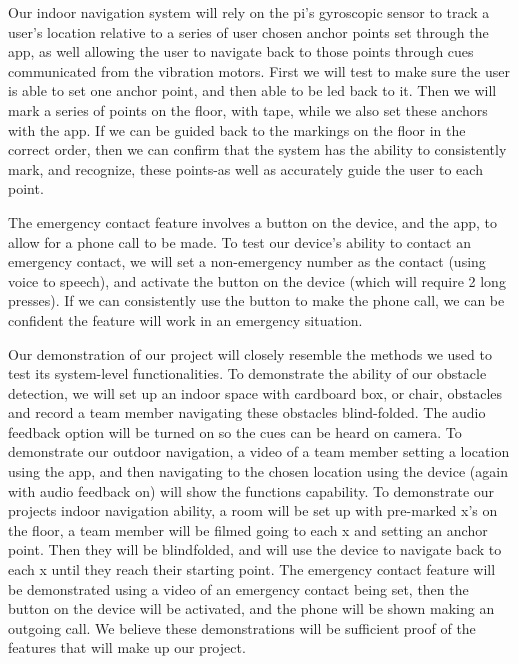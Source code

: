 \documentclass[letterpaper,12pt]{article}
\begin{document}
Our indoor navigation system will rely on the pi's gyroscopic sensor to track a user's location relative to a series of user chosen anchor points set through the app, as well allowing the user to navigate back to those points through cues communicated from the vibration motors. First we will test to make sure the user is able to set one anchor point, and then able to be led back to it. Then we will mark a series of points on the floor, with tape, while we also set these anchors with the app. If we can be guided back to the markings on the floor in the correct order, then we can confirm that the system has the ability to consistently mark, and recognize, these points-as well as accurately guide the user to each point. \par

The emergency contact feature involves a button on the device, and the app, to allow for a phone call to be made. To test our device's ability to contact an emergency contact, we will set a non-emergency number as the contact (using voice to speech), and activate the button on the device (which will require 2 long presses). If we can consistently use the button to make the phone call, we can be confident the feature will work in an emergency situation.\par

Our demonstration of our project will closely resemble the methods we used to test its system-level functionalities. To demonstrate the ability of our obstacle detection, we will set up an indoor space with cardboard box, or chair, obstacles  and record a team member navigating these obstacles blind-folded. The audio feedback option will be turned on so the cues can be heard on camera. To demonstrate our outdoor navigation, a video of a team member setting a location using the app, and then navigating to the chosen location using the device (again with audio feedback on) will show the functions capability. To demonstrate our projects indoor navigation ability, a room will be set up with pre-marked x's on the floor, a team member will be filmed going to each x and setting an anchor point. Then they will be blindfolded, and will use the device to navigate back to each x until they reach their starting point. The emergency contact feature will be demonstrated using a video of an emergency contact being set, then the button on the device will be activated, and the phone will be shown making an outgoing call. We believe these demonstrations will be sufficient proof of the features that will make up our project. \par
\end{document}
